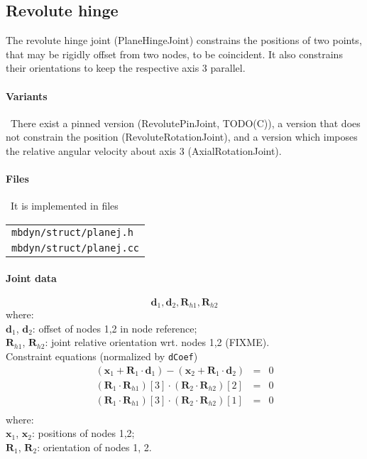 \documentclass[10pt,dvips,fleqn]{report}
\newcommand{\T}[1]{\boldsymbol{#1}}
\begin{document}
\subsection{Revolute hinge}
The revolute hinge joint (PlaneHingeJoint) constrains the positions 
of two points, that may be rigidly offset from two nodes, 
to be coincident.
It also constrains their orientations to keep the respective axis 3 
parallel.

\paragraph{Variants} \
There exist a pinned version (RevolutePinJoint, TODO(C)),
a version that does not constrain the position (RevoluteRotationJoint),
and a version which imposes the relative angular velocity about axis 3
(AxialRotationJoint).

\paragraph{Files} \
It is implemented in files

\begin{tabular}{l}
\texttt{mbdyn/struct/planej.h} \\
\texttt{mbdyn/struct/planej.cc}
\end{tabular}

\paragraph{Joint data}
\begin{equation}
\T d_1, \T d_2, \T R_{h1}, \T R_{h2}
\end{equation}
where:\\
$\T d_1$, $\T d_2$: offset of nodes 1,2 in node reference;\\
$\T R_{h1}$, $\T R_{h2}$: joint relative orientation wrt. nodes 1,2 (FIXME).\\

\noindent
Constraint equations (normalized by \texttt{dCoef})
\begin{eqnarray*}
	(\T x_1+\T R_1\cdot \T d_1) - (\T x_2+\T R_1\cdot \T d_2)& = & 0 \\
	(\T R_1\cdot \T R_{h1})[3]\cdot (\T R_2\cdot \T R_{h2})[2] & = & 0 \\
	(\T R_1\cdot \T R_{h1})[3]\cdot (\T R_2\cdot \T R_{h2})[1] & = & 0 \\
\end{eqnarray*}
where:\\
$\T x_1$, $\T x_2$: positions of nodes 1,2;\\
$\T R_{1}$, $\T R_{2}$: orientation of nodes 1, 2.\\
\end{document}
